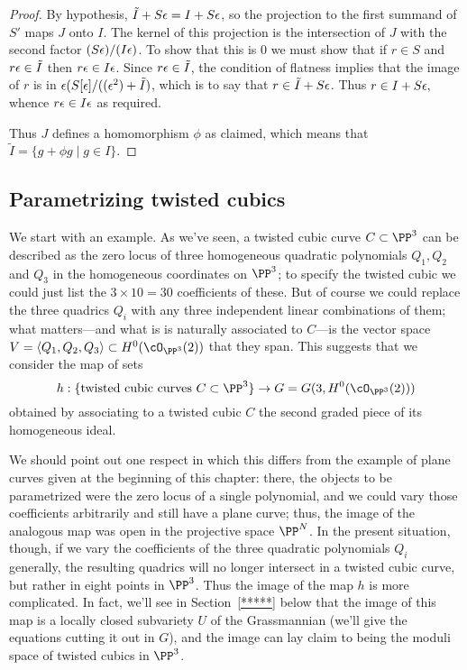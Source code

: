 \begin{proof}
By hypothesis, $\tilde I + S\eps = I +S\eps$, so the projection  to the first  summand of $S'$ maps $J$ onto $I$. The kernel of this projection is
the intersection of $J$ with the second factor $(S\eps )/(I\eps )$. To show that this is 0 we must show that
if $r\in S$ and $r\eps \in \tilde I$ then $r\eps \in I\eps$. Since $r\eps \in \tilde I$, the condition of flatness implies
that the image of $r$ is in $\eps(S[\eps]/((\eps^2)+\tilde I)$, which is to say that $r \in \tilde I + S\eps$.
Thus $r \in  I + S\eps,$ whence $r\eps \in I\eps$ as required.

Thus
$J$ defines a homomorphism $\phi$ as claimed, which means that
 $\tilde I = \{g+\phi g\mid g\in I\}$.
\end{proof}


\subsection{Parametrizing twisted cubics} We  start with an example. As we've seen, a twisted cubic curve $C \subset \PP^3$ can be described as the zero locus of three homogeneous quadratic polynomials $Q_1, Q_2$ and $Q_3$ in the homogeneous coordinates on $\PP^3$; to specify the twisted cubic we could just list the $3 \times 10 = 30$ coefficients of these. But of course we could replace the three quadrics $Q_i$ with any three independent linear combinations of them; what matters---and what is is naturally associated to $C$---is the vector space $V = \langle Q_1, Q_2, Q_3 \rangle \subset H^0(\cO_{\PP^3}(2))$ that they span. This suggests that we consider the map of sets
$$
h : \{ \text{twisted cubic curves } C \subset \PP^3 \} \to G = G(3, H^0(\cO_{\PP^3}(2)))
$$
obtained by associating to a twisted cubic $C$ the second graded piece of its homogeneous ideal. 

We should point out one respect in which this differs from the example of plane curves given at the beginning of this chapter: there, the objects to be parametrized were the zero locus of a single polynomial, and we could vary those coefficients arbitrarily and still have a plane curve; thus, the image of the analogous map was open in the projective space $\PP^N$. In the present situation, though, if we vary the coefficients of the three quadratic polynomials $Q_i$ generally, the resulting quadrics will no longer intersect in a twisted cubic curve, but rather in eight points in $\PP^3$. Thus the image of the map $h$ is more complicated.
In fact, we'll see in Section~\ref{*****} below that the image of this map is a locally closed subvariety $U$ of the Grassmannian (we'll give the equations cutting it out in $G$), and the image can lay claim to being the moduli space of twisted cubics in $\PP^3$.


